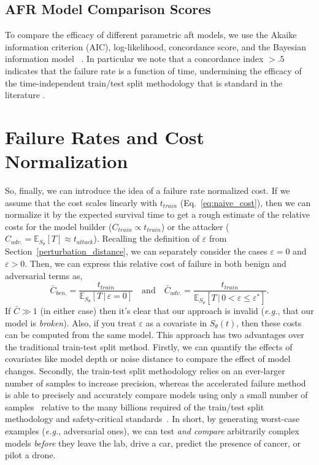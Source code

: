 \subsection{AFR Model Comparison Scores}
\label{metrics}

To compare the efficacy of different parametric aft models, we use the Akaike information criterion (AIC), log-likelihood, concordance score, and the Bayesian information model ~\citep{stoica2004model,taddy2019business}. In particular we note that a concordance index $> .5$ indicates that the failure rate is a function of time, undermining the efficacy of the time-independent train/test split methodology that is standard in the literature \cite{concordance}.





\section{Failure Rates and Cost Normalization}


\label{cost_normalization}


So, finally, we can introduce the idea of a failure rate normalized cost. If we assume that the cost scales linearly with $t_{train}$ (Eq.~\ref{eq:naive_cost}), then we can normalize it by the expected survival time to get a rough estimate of the relative costs for the model builder ($C_{train} \propto t_{train}$) or the attacker ($C_{adv.} = \mathbb{E}_{S_\theta}[T] \approx t_{attack}$). Recalling the definition of $\varepsilon$ from Section~\ref{perturbation_distance}, we can separately consider the cases $\varepsilon=0$ and $\varepsilon > 0$. Then, we can express this relative cost of failure in both benign and adversarial terms as,
\begin{equation}
	\bar{C}_{ben.} = \frac{t_{train}}{\mathbb{E}_{S_\theta}[T \,|\, \varepsilon = 0] }
	\text{~~~and~~~}
	\bar{C}_{adv.} = \frac{t_{train}}{\mathbb{E}_{S_\theta}[T \,|\, 0 < \varepsilon \leq \varepsilon^*]}.
	\label{eq:cost}
\end{equation}
If $\bar{C} \gg 1$ (in either case) then it's clear that our approach is invalid (\textit{e.g.}, that our model is \textit{broken}). Also, if you treat $\varepsilon$ as a covariate in ${S_\theta}(t)$, then these costs can be computed from the same model.
This approach has two advantages over the traditional train-test split method. Firstly, we can quantify the effects of covariates like model depth or noise distance to compare the effect of model changes. Secondly, the train-test split methodology relies on an ever-larger number of samples to increase precision, whereas the accelerated failure method is able to precisely and accurately compare models using only a small number of samples~\cite{schmoor2000sample,lachin1981introduction} relative to the many billions required of the train/test split methodology and safety-critical standards~\cite{iso26262,IEC61508,IEC62034,meyers}.
In short, by generating worst-case examples (\textit{e.g.}, adversarial ones), we can test \textit{and compare} arbitrarily complex models \textit{before} they leave the lab, drive a car, predict the presence of cancer, or pilot a drone.